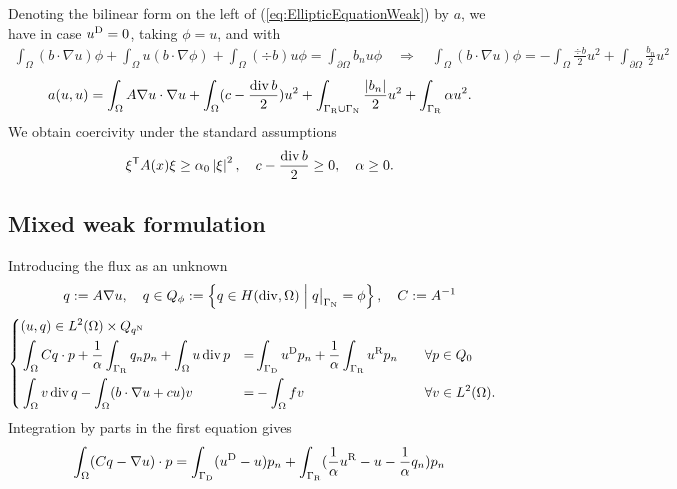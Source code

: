 Denoting the bilinear form on the left of (\ref{eq:EllipticEquationWeak}) by $a$, we have in case $u^{\rm D}=0$, taking $\phi=u$, and with
%
%
\begin{align*}
\int_{\Omega}(b\cdot \nabla u)\phi + \int_{\Omega}u (b\cdot \nabla \phi) + \int_{\Omega}(\div b) u\phi = \int_{\partial\Omega}b_n u\phi 
\quad\Rightarrow\quad \int_{\Omega}(b\cdot \nabla u)\phi = - \int_{\Omega}\frac{\div b}{2} u^2 + \int_{\partial\Omega}\frac{b_n}{2} u^2
\end{align*}
%
%
\begin{align*}
a(u,u) = \int_{\Omega} A\nabla u \cdot\nabla u  + \int_{\Omega}(c-\frac{\operatorname{div} b}{2})u^2 + \int_{\Gamma_{\rm R}\cup\Gamma_{\rm N}}\frac{\left|b_n\right|}{2} u^2+ \int_{\Gamma_{\rm R}}\alpha u^2.
\end{align*}
%
We obtain coercivity under the standard assumptions
%
\begin{equation}\label{eq:}
{\xi}^{\mathsf{T}}A(x)\xi \ge \alpha_0\left|\xi\right|^2,\quad c-\frac{\operatorname{div} b}{2}\ge0,\quad \alpha\ge0.
\end{equation}
%
%
%
\subsection{Mixed weak formulation}\label{subsec:}
%
Introducing the flux as an unknown
%
%
\begin{align*}
q := A\nabla u, \quad q\in Q_{\phi} := \SetDef{q\in \Hdiv}{\Rest{q}{\GammaN}=\phi}, \quad C := A^{-1}\\
\end{align*}
%
%
%
\begin{equation}\label{eq:}
%
\left\{
\begin{aligned}
&(u,q) \in L^2(\Omega)\times Q_{\qN}\\
&\int_{\Omega} Cq\cdot p +  \frac{1}{\alpha}\int_{\GammaR} q_np_n+ \int_{\Omega} u\div p &=& \int_{\GammaD}\uD p_n+ \frac{1}{\alpha}\int_{\GammaR}\uR p_n&\quad &\forall p\in Q_0\\
&\int_{\Omega} v\div q - \int_{\Omega} (b\cdot\nabla u + cu)v&=& -\int_{\Omega} fv &\quad&\forall v\in L^2(\Omega).
\end{aligned}
\right.
% 
\end{equation}
%
Integration by parts in the first equation gives
%
\begin{align*}
\int_{\Omega} (Cq-\nabla u)\cdot p =  \int_{\Gamma_{\rm D}}(u^{\rm D}-u) p_n + \int_{\Gamma_{\rm R}}( \frac{1}{\alpha}u^{\rm R} - u -  \frac{1}{\alpha}q_n)p_n 
\end{align*}
%

